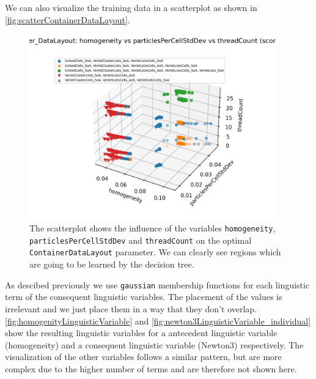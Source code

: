We can also visualize the training data in a scatterplot as shown in \autoref{fig:scatterContainerDataLayout}.


\begin{figure}[H]
    \centering
    \includegraphics[height=8cm,trim={0cm 0.7cm 1cm 1.5cm},clip]{figures/DataAnalytics/scatter_container_datalayout.png}
    \caption[Scatterplot of the ContainerDataLayout parameter]{The scatterplot shows the influence of the variables \texttt{homogeneity}, \texttt{particlesPerCellStdDev} and \texttt{threadCount} on the optimal \texttt{ContainerDataLayout} parameter. We can clearly see regions which are going to be learned by the decision tree.}
    \label{fig:scatterContainerDataLayout}

\end{figure}



As descibed previously we use \texttt{gaussian} membership functions for each linguistic term of the consequent linguistic variables. The placement of the  values is irrelevant and we just place them in a way that they don't overlap. \autoref{fig:homogenityLinguisticVariable} and \autoref{fig:newton3LinguisticVariable_individual} show the resulting linguistic variables for a antecedent linguistic variable (homogeneity) and a consequent linguistic variable (Newton3) respectively. The visualization of the other variables follows a similar pattern, but are more complex due to the higher number of terms and are therefore not shown here.



